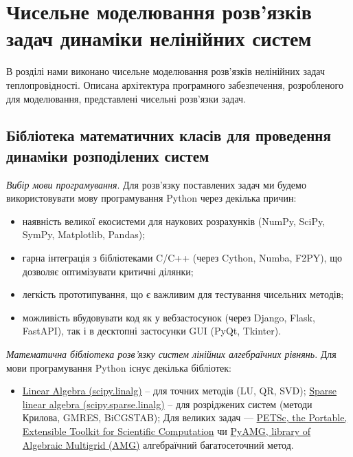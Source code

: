 \chapter{Чисельне моделювання розв’язків задач динаміки нелінійних систем} \label{chapt4}

В розділі нами виконано чисельне моделювання розв’язків нелінійних задач теплопровідності. Описана архітектура
програмного забезпечення, розробленого для моделювання, представлені чисельні розв’язки задач.

\section{Бібліотека математичних класів для проведення динаміки розподілених систем} \label{sect4_1}

\textit{Вибір мови програмування}. Для розв'язку поставлених задач ми будемо використовувати мову програмування Python
через декілька причин:
\begin{itemize}
    \item наявність великої екосистеми для наукових розрахунків (NumPy, SciPy, SymPy, Matplotlib, Pandas);
    \item гарна інтеграція з бібліотеками C/C++ (через Cython, Numba, F2PY), що дозволяє оптимізувати критичні ділянки;
    \item легкість прототипування, що є важливим для тестування чисельних методів;
    \item можливість вбудовувати код як у вебзастосунок (через Django, Flask, FastAPI), так і в десктопні застосунки GUI (PyQt, Tkinter).
\end{itemize}

\textit{Математична бібліотека розв'язку систем лінійних алгебраїчних рівнянь}. Для мови програмування Python існує декілька
бібліотек:
\begin{itemize}
    \item \href{https://docs.scipy.org/doc/scipy/reference/linalg.html#module-scipy.linalg}{Linear Algebra (scipy.linalg)} -- для точних методів (LU, QR, SVD);
    \href{https://docs.scipy.org/doc/scipy/reference/sparse.linalg.html}{Sparse linear algebra (scipy.sparse.linalg)}  -- для розріджених систем (методи Крилова, GMRES, BiCGSTAB);
    Для великих задач — \href{https://petsc.org/release/}{PETSc, the Portable, Extensible Toolkit for Scientific Computation} чи
    \href{https://pypi.org/project/pyamg/}{PyAMG, library of Algebraic Multigrid (AMG)} алгебраїчний багатосеточний метод.
\end{itemize}

